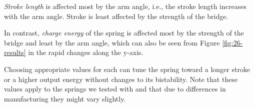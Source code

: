 \textit{Stroke length} is affected most by the arm angle, i.e., the stroke length increases with the arm angle. Stroke is least affected by the strength of the bridge. 

In contrast, \textit{charge energy} of the spring is affected most by the strength of the bridge and least by the arm angle, which can also be seen from Figure \ref{fig:26-results} in the rapid changes along the y-axis. 

Choosing appropriate values for each can tune the spring toward a longer stroke or a higher output energy without changes to its bistability. Note that these values apply to the springs we tested with and that due to differences in manufacturing they might vary slightly.









